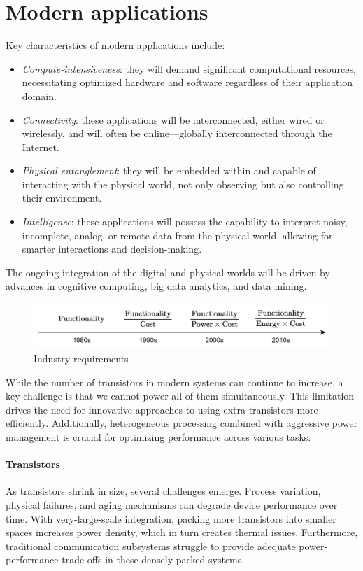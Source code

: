 \section{Modern applications}

Key characteristics of modern applications include:
\begin{itemize}
    \item \textit{Compute-intensiveness}: they will demand significant computational resources, necessitating optimized hardware and software regardless of their application domain.
    \item \textit{Connectivity}: these applications will be interconnected, either wired or wirelessly, and will often be online—globally interconnected through the Internet.
    \item \textit{Physical entanglement}: they will be embedded within and capable of interacting with the physical world, not only observing but also controlling their environment. 
    \item \textit{Intelligence}: these applications will possess the capability to interpret noisy, incomplete, analog, or remote data from the physical world, allowing for smarter interactions and decision-making.
\end{itemize}
The ongoing integration of the digital and physical worlds will be driven by advances in cognitive computing, big data analytics, and data mining.
\begin{figure}[H]
    \centering
    \includegraphics[width=0.75\linewidth]{images/time.png}
    \caption{Industry requirements}
\end{figure}
While the number of transistors in modern systems can continue to increase, a key challenge is that we cannot power all of them simultaneously. 
This limitation drives the need for innovative approaches to using extra transistors more efficiently. 
Additionally, heterogeneous processing combined with aggressive power management is crucial for optimizing performance across various tasks.

\paragraph*{Transistors}
As transistors shrink in size, several challenges emerge. 
Process variation, physical failures, and aging mechanisms can degrade device performance over time. 
With very-large-scale integration, packing more transistors into smaller spaces increases power density, which in turn creates thermal issues. 
Furthermore, traditional communication subsystems struggle to provide adequate power-performance trade-offs in these densely packed systems. 

